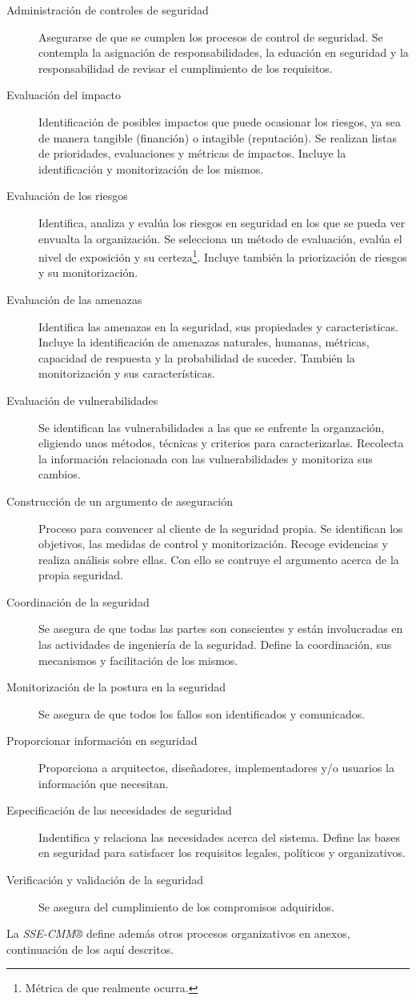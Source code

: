 \documentclass[11pt,a4paper]{article}
\begin{document}
\begin{description}
\item[Administración de controles de seguridad] Asegurarse de que se
  cumplen los procesos de control de seguridad. Se contempla la
  asignación de responsabilidades, la eduación en seguridad y la
  responsabilidad de revisar el cumplimiento de los requisitos.
\item[Evaluación del impacto] Identificación de posibles impactos que
  puede ocasionar los riesgos, ya sea de manera tangible (financión) o
  intagible (reputación). Se realizan listas de prioridades,
  evaluaciones y métricas de impactos. Incluye la identificación y
  monitorización de los mismos.
\item[Evaluación de los riesgos] Identifica, analiza y evalúa los
  riesgos en seguridad en los que se pueda ver envualta la
  organización. Se selecciona un método de evaluación, evalúa el nivel
  de exposición y su certeza\footnote{Métrica de que realmente
    ocurra.}. Incluye también la priorización de riesgos y su
  monitorización. 
\item[Evaluación de las amenazas] Identifica las amenazas en la
  seguridad, sus propiedades y caracteristicas. Incluye la
  identificación de amenazas naturales, humanas, métricas, capacidad
  de respuesta y la probabilidad de suceder. También la monitorización
  y sus características.
\item[Evaluación de vulnerabilidades] Se identifican las
  vulnerabilidades a las que se enfrente la organzación, eligiendo
  unos métodos, técnicas y criterios para caracterizarlas. Recolecta
  la información relacionada con las vulnerabilidades y monitoriza sus
  cambios.
\item[Construcción de un argumento de aseguración] Proceso para
  convencer al cliente de la seguridad propia. Se identifican los 
  objetivos, las medidas de control y monitorización. Recoge
  evidencias y realiza análisis sobre ellas. Con ello se contruye el
  argumento acerca de la propia seguridad.
\item[Coordinación de la seguridad] Se asegura de que todas las partes
  son conscientes y están involucradas en las actividades de
  ingeniería de la seguridad. Define la coordinación, sus mecanismos y
  facilitación de los mismos.
\item[Monitorización de la postura en la seguridad] Se asegura de que
  todos los fallos son identificados y comunicados.
\item[Proporcionar información en seguridad] Proporciona a arquitectos,
  diseñadores, implementadores y/o usuarios la información que
  necesitan.
\item[Especificación de las necesidades de seguridad] Indentifica y
  relaciona las necesidades acerca del sistema. Define las bases en
  seguridad para satisfacer los requisitos legales, políticos y
  organizativos.
\item[Verificación y validación de la seguridad] Se asegura del
  cumplimiento de los compromisos adquiridos.
\end{description}

La \emph{SSE-CMM®} define además otros procesos organizativos en
anexos, continuación de los aquí descritos.
\end{document}

